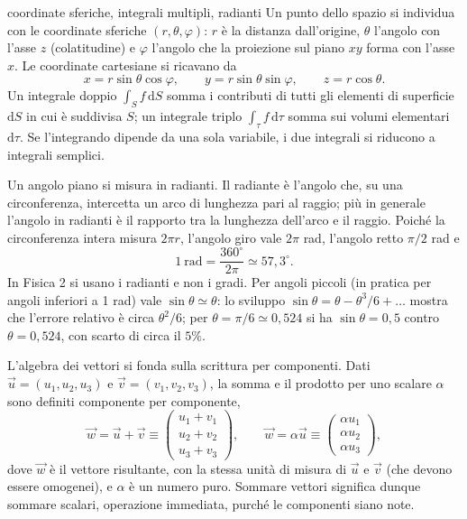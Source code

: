 \documentclass[11pt,a4paper]{article}
\newcommand{\dd}{\mathrm{d}}
\newcommand{\titoletto}[1]{\par\Needspace{4\baselineskip}\medskip\noindent{\large\scshape #1}\par\nopagebreak\smallskip\noindent}
\begin{document}
\begin{richiamo}{coordinate sferiche, integrali multipli, radianti}
Un punto dello spazio si individua con le coordinate sferiche $(r,\theta,\varphi)$: $r$ è la distanza dall'origine, $\theta$ l'angolo con l'asse $z$ (colatitudine) e $\varphi$ l'angolo che la proiezione sul piano $xy$ forma con l'asse $x$. Le coordinate cartesiane si ricavano da
\[
x=r\sin\theta\cos\varphi,\qquad y=r\sin\theta\sin\varphi,\qquad z=r\cos\theta .
\]
Un integrale doppio $\int_S f\,\dd S$ somma i contributi di tutti gli elementi di superficie $\dd S$ in cui è suddivisa $S$; un integrale triplo $\int_\tau f\,\dd\tau$ somma sui volumi elementari $\dd\tau$. Se l'integrando dipende da una sola variabile, i due integrali si riducono a integrali semplici.

Un angolo piano si misura in radianti. Il radiante è l'angolo che, su una circonferenza, intercetta un arco di lunghezza pari al raggio; più in generale l'angolo in radianti è il rapporto tra la lunghezza dell'arco e il raggio. Poiché la circonferenza intera misura $2\pi r$, l'angolo giro vale $2\pi$ rad, l'angolo retto $\pi/2$ rad e
\[
1\ \mathrm{rad}=\frac{360^\circ}{2\pi}\simeq 57{,}3^\circ .
\]
In Fisica 2 si usano i radianti e non i gradi. Per angoli piccoli (in pratica per angoli inferiori a 1 rad) vale $\sin\theta\simeq\theta$: lo sviluppo $\sin\theta=\theta-\theta^3/6+\dots$ mostra che l'errore relativo è circa $\theta^2/6$; per $\theta=\pi/6\simeq0{,}524$ si ha $\sin\theta=0{,}5$ contro $\theta=0{,}524$, con scarto di circa il $5\%$.
\end{richiamo}

\titoletto{Teoria, modelli e dimostrazioni.} 
L'algebra dei vettori si fonda sulla scrittura per componenti. Dati $\vec u=(u_1,u_2,u_3)$ e $\vec v=(v_1,v_2,v_3)$, la somma e il prodotto per uno scalare $\alpha$ sono definiti componente per componente,
\[
\vec w=\vec u+\vec v\equiv\begin{pmatrix}u_1+v_1\\u_2+v_2\\u_3+v_3\end{pmatrix},\qquad
\vec w=\alpha\vec u\equiv\begin{pmatrix}\alpha u_1\\\alpha u_2\\\alpha u_3\end{pmatrix},
\]
dove $\vec w$ è il vettore risultante, con la stessa unità di misura di $\vec u$ e $\vec v$ (che devono essere omogenei), e $\alpha$ è un numero puro. Sommare vettori significa dunque sommare scalari, operazione immediata, purché le componenti siano note.
\end{document}
